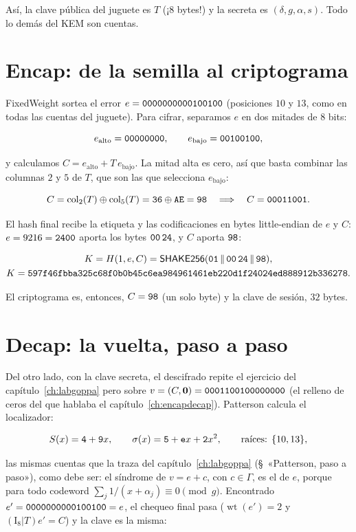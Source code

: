 \documentclass[11pt,a4paper,oneside]{report}
\newcommand{\wt}{\operatorname{wt}}
\newcommand{\hx}[1]{\text{\texttt{#1}}}
\begin{document}
Así, la clave pública del juguete es $T$ (¡$8$ bytes!) y la secreta es
$(\delta,g,\alpha,s)$. Todo lo demás del KEM son cuentas.

\section{Encap: de la semilla al criptograma}

\textsf{FixedWeight} sortea el error
$e=\hx{0000000000100100}$ (posiciones $10$ y $13$, como en todas las
cuentas del juguete). Para cifrar, separamos $e$ en dos mitades de $8$
bits:

\[
  e_{\text{alto}}=\hx{00000000},\qquad
  e_{\text{bajo}}=\hx{00100100},
\]

y calculamos $C=e_{\text{alto}}+T\,e_{\text{bajo}}$. La mitad alta es
cero, así que basta combinar las columnas $2$ y $5$ de $T$, que son las
que selecciona $e_{\text{bajo}}$:

\[
  C=\mathrm{col}_2(T)\oplus\mathrm{col}_5(T)
  =\hx{36}\oplus\hx{AE}=\hx{98}
  \quad\Longrightarrow\quad
  C=\hx{00011001}.
\]

El hash final recibe la etiqueta y las codificaciones en bytes
little-endian de $e$ y $C$: $e=9216=\hx{2400}$ aporta los bytes
$\hx{00\,24}$, y $C$ aporta $\hx{98}$:

\[
  \begin{gathered}
    K=H(1,e,C)=\textsf{SHAKE256}(\hx{01}\,\|\,\hx{00\,24}\,\|\,\hx{98}),\\
    K=\hx{597f46fbba325c68f0b0b45c6ea984961461eb220d1f24024ed888912b336278}.
  \end{gathered}
\]

El criptograma es, entonces, $C=\hx{98}$ (un solo byte) y la clave de
sesión, $32$ bytes.

\section{Decap: la vuelta, paso a paso}

Del otro lado, con la clave secreta, el descifrado repite el ejercicio
del capítulo~\ref{ch:labgoppa} pero sobre
$v=(C,\mathbf{0})=\hx{0001100100000000}$ (el relleno de ceros del que
hablaba el capítulo~\ref{ch:encapdecap}). Patterson calcula el
localizador:

\[
  S(x)=\hx4+\hx9x,\qquad \sigma(x)=\hx5+\hx e x+\hx2x^2,
  \qquad \text{raíces: }\{10,13\},
\]

las mismas cuentas que la traza del capítulo~\ref{ch:labgoppa}
(§~«Patterson, paso a paso»), como debe ser: el síndrome de $v=e+c$,
con $c\in\Gamma$, es el de $e$, porque para todo codeword
$\sum_j 1/(x+\alpha_j)\equiv0\pmod g$. Encontrado
$e'=\hx{0000000000100100}=e$, el chequeo final pasa
($\wt(e')=2$ y $(\mathrm{I}_8|T)e'=C$) y la clave es la misma:
\end{document}
